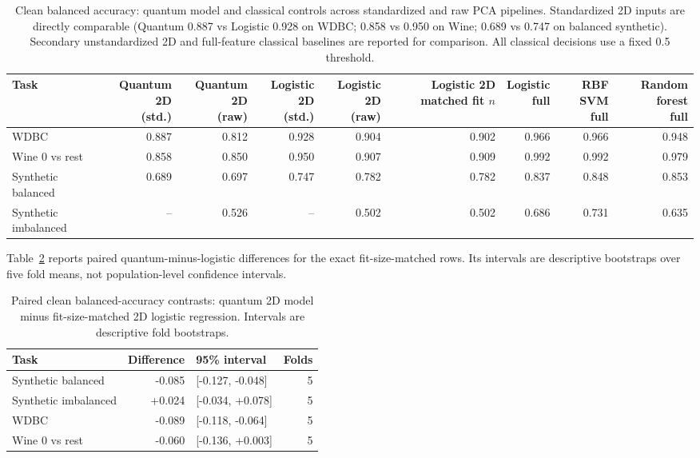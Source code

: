 \documentclass[conference]{IEEEtran}
\begin{document}
\begin{table}[t]\centering\scriptsize
\caption{Clean balanced accuracy: quantum model and classical controls across standardized and raw PCA pipelines. Standardized 2D inputs are directly comparable (Quantum 0.887 vs Logistic 0.928 on WDBC; 0.858 vs 0.950 on Wine; 0.689 vs 0.747 on balanced synthetic). Secondary unstandardized 2D and full-feature classical baselines are reported for comparison. All classical decisions use a fixed 0.5 threshold.}
\label{tab:classical}
\begin{tabular}{@{}l r r r r r r r r@{}}\toprule
Task & \shortstack{Quantum 2D\\(std.)} & \shortstack{Quantum 2D\\(raw)} & \shortstack{Logistic 2D\\(std.)} & \shortstack{Logistic 2D\\(raw)} & \shortstack{Logistic 2D\\matched fit $n$} & \shortstack{Logistic\\full} & \shortstack{RBF SVM\\full} & \shortstack{Random forest\\full} \\
\midrule
WDBC & 0.887 & 0.812 & 0.928 & 0.904 & 0.902 & 0.966 & 0.966 & 0.948 \\
Wine 0 vs rest & 0.858 & 0.850 & 0.950 & 0.907 & 0.909 & 0.992 & 0.992 & 0.979 \\
Synthetic balanced & 0.689 & 0.697 & 0.747 & 0.782 & 0.782 & 0.837 & 0.848 & 0.853 \\
Synthetic imbalanced & -- & 0.526 & -- & 0.502 & 0.502 & 0.686 & 0.731 & 0.635 \\
\bottomrule\end{tabular}\end{table}
Table~\ref{tab:classicalpaired} reports paired quantum-minus-logistic differences for the exact fit-size-matched rows. Its intervals are descriptive bootstraps over five fold means, not population-level confidence intervals.
\begin{table}[t]\centering\scriptsize
\caption{Paired clean balanced-accuracy contrasts: quantum 2D model minus fit-size-matched 2D logistic regression. Intervals are descriptive fold bootstraps.}
\label{tab:classicalpaired}
\begin{tabular}{@{}l r l r@{}}\toprule
Task & Difference & 95\% interval & Folds \\
\midrule
Synthetic balanced & -0.085 & [-0.127, -0.048] & 5 \\
Synthetic imbalanced & +0.024 & [-0.034, +0.078] & 5 \\
WDBC & -0.089 & [-0.118, -0.064] & 5 \\
Wine 0 vs rest & -0.060 & [-0.136, +0.003] & 5 \\
\bottomrule\end{tabular}\end{table}
\end{document}
